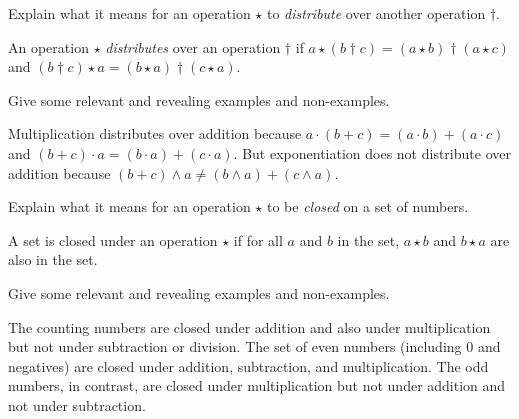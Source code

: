 \documentclass[nooutcomes]{ximera}
\begin{document}
\begin{problem}Explain what it means for an operation $\star$ to \textit{distribute}
  over another operation $\dagger$. 
\begin{freeResponse}
\begin{hint}
An operation $\star$ \textit{distributes} over an operation $\dagger$ if $a\star(b\dagger c) = (a\star b) \dagger (a\star c)$ and $(b\dagger c)\star a = (b\star a) \dagger (c\star a)$.  
\end{hint}
\end{freeResponse}

\begin{problem}
Give some relevant and revealing examples and non-examples.
\begin{freeResponse}
\begin{hint}
Multiplication distributes over addition because $a\cdot(b+c) = (a\cdot b)+(a\cdot c)$ and $(b+c)\cdot a = (b\cdot a)+(c\cdot a)$.  
But exponentiation does not distribute over addition because $(b+c)\wedge a \ne (b\wedge a)+(c\wedge a)$.
\end{hint}
\end{freeResponse}
\end{problem} 
\end{problem}

\begin{problem}Explain what it means for an operation $\star$ to be \textit{closed}
  on a set of numbers. 
\begin{freeResponse}
\begin{hint}
A set is closed under an operation $\star$ if for all $a$ and $b$ in the set, $a\star b$ and $b\star a$ are also in the set.  
\end{hint}
\end{freeResponse}

\begin{problem}
Give some relevant and revealing examples and non-examples.
\begin{freeResponse}
\begin{hint}
The counting numbers are closed under addition and also under multiplication but not under subtraction or division.  The set of even numbers (including $0$ and negatives) are closed under addition, subtraction, and multiplication.  The odd numbers, in contrast, are closed under multiplication but not under addition and not under subtraction.
\end{hint}
\end{freeResponse}
\end{problem}
\end{problem} 
\end{document}
